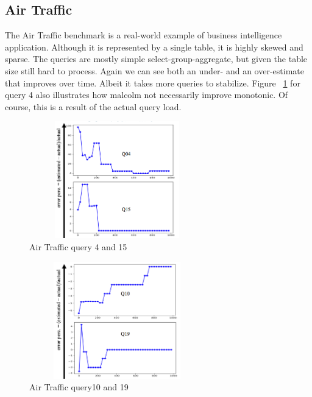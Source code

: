 \documentclass[conference]{IEEEtran}
\begin{document}
\subsection{Air Traffic}
The Air Traffic benchmark is a real-world example of  business intelligence application.
Although it is represented by a single table, it is highly skewed and sparse.
The queries are mostly simple select-group-aggregate, but given the table size still hard to process.
Again we can see both an under- and an over-estimate that improves over time. Albeit it takes more queries to stabilize.
Figure ~\ref{fig:4-15} for query 4  also illustrates how {\sc malcolm} not necessarily improve monotonic.
Of course, this is a result of the actual query load.

\begin{figure}[t!]
	\centering
	\includegraphics[height=2in,width=3in]{Figures/Q4-15.png}
	\caption{Air Traffic query 4 and 15
		\label{fig:4-15}}
\end{figure}

\begin{figure}[t!]
	\centering
	\includegraphics[height=2in,width=3in]{Figures/Q10-19.png}
	\caption{Air Traffic query10 and 19
		\label{fig:q10-19}}
\end{figure}
\end{document}
